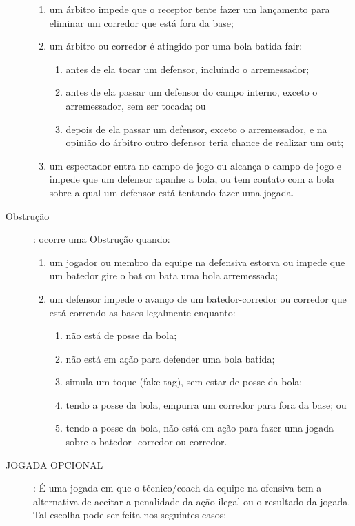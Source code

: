\begin{description}
\begin{enumerate}[label=\alph*)]
		\item  um \'arbitro impede que o receptor tente fazer um lan\c{c}amento para eliminar um corredor que est\'a fora da base; 
		
		\item  um \'arbitro ou corredor \'e atingido por uma bola batida \gls{fair}: 
		\begin{enumerate}[label=\roman*.]
			\item  antes de ela tocar um defensor, incluindo o arremessador; 
			\item antes de ela passar um defensor do campo interno, exceto o arremessador, sem ser tocada; ou 
			\item depois de ela passar um defensor, exceto o arremessador, e na opini\~ao do \'arbitro outro defensor teria chance de realizar um \gls{out}; 
		\end{enumerate}
		\item  um espectador entra no campo de jogo ou alcan\c{c}a o campo de jogo e impede que um defensor apanhe a bola, ou tem contato com a bola sobre a qual um defensor est\'a tentando fazer uma jogada. 
	\end{enumerate}
	
	\item[Obstru\c{c}\~ao]: ocorre uma Obstru\c{c}\~ao quando: 
	
	\begin{enumerate}[label=\alph*)]
		\item um jogador ou membro da equipe na defensiva estorva ou impede que um batedor gire o \gls{bat} ou bata uma bola arremessada; 
		
		\item  um defensor impede o avan\c{c}o de um batedor-corredor ou corredor que est\'a correndo as bases legalmente enquanto: 
		\begin{enumerate}[label= \arabic*)]
			\item   n\~ao est\'a de posse da bola; 
			\item   n\~ao est\'a em a\c{c}\~ao para defender uma bola batida; 
			\item   simula um toque (\gls{fake tag}), sem estar de posse da bola; 
			\item   tendo a posse da bola, empurra um corredor para fora da base; ou 
			\item   tendo a posse da bola, n\~ao est\'a em a\c{c}\~ao para fazer uma jogada sobre o batedor-
			corredor ou corredor. 
		\end{enumerate}
	\end{enumerate}
	\item[JOGADA OPCIONAL]: \'E uma jogada em que o t\'ecnico/\gls{coach} da equipe na ofensiva tem a alternativa de aceitar a penalidade da a\c{c}\~ao ilegal ou o resultado da jogada. Tal escolha pode ser feita nos seguintes casos: 


\end{description}
